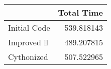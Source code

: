 \begin{tabular}{lr}
\toprule
{} &  Total Time \\
\midrule
Initial Code &  539.818143 \\
Improved ll  &  489.207815 \\
Cythonized   &  507.522965 \\
\bottomrule
\end{tabular}
